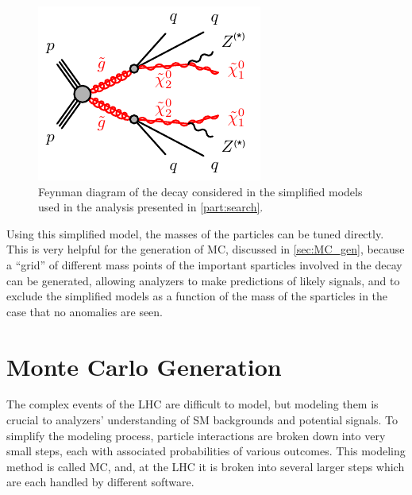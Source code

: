 \begin{centering}
\begin{figure}[!hbt]
\myfloatalign
\includegraphics[width=.9\linewidth]{figures/theory/gogo-qqqqZZN1N1.pdf}
\caption{Feynman diagram of the decay considered in the simplified models used in the analysis presented in \autoref{part:search}.}
\label{fig:simpmodel}
\end{figure}
\end{centering}

Using this simplified model, the masses of the particles can be tuned directly. This is very helpful for the generation of \ac{MC}, discussed in \autoref{sec:MC_gen}, because a ``grid'' of different mass points of the important sparticles involved in the decay can be generated, allowing analyzers to make predictions of likely signals, and to exclude the simplified models as a function of the mass of the sparticles in the case that no anomalies are seen. 

\section{Monte Carlo Generation}
\label{sec:MC_gen}

The complex events of the \ac{LHC} are difficult to model, but modeling them is crucial to analyzers' understanding of \ac{SM} backgrounds and potential signals. To simplify the modeling process, particle interactions are broken down into very small steps, each with associated probabilities of various outcomes. This modeling method is called \acf{MC}, and, at the \ac{LHC} it is broken into several larger steps which are each handled by different software. 

